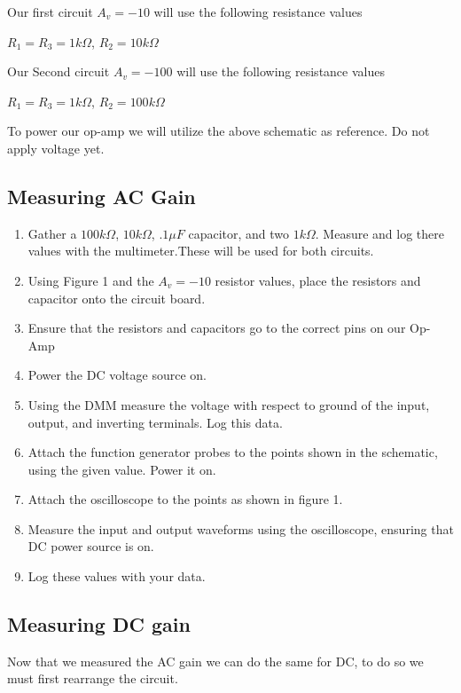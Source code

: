 \documentclass[12pt]{article}
\begin{document}
\begin{center}
	Our first circuit $A_v=-10$ will use the following resistance values
\end{center}
\begin{center}
	$R_1 =R_3= 1k\Omega$, $R_2 = 10k\Omega$
\end{center}
\begin{center}
	Our Second circuit $A_v=-100$ will use the following resistance values
\end{center}

\begin{center}
	$R_1 =R_3= 1k\Omega$, $R_2 = 100k\Omega$
\end{center}


To power our op-amp we will utilize the above schematic as reference. Do not apply voltage yet.



\newpage
\subsection{Measuring AC Gain}
\begin{enumerate}
	\item Gather a $100k\Omega$, $10k\Omega$, $.1\mu F$ capacitor, and two $1k\Omega$. Measure and log there values with the multimeter.These will be used for both circuits.
	\item Using Figure 1 and the $A_v=-10$ resistor values, place the resistors and capacitor onto the circuit board.
	\item Ensure that the resistors and capacitors go to the correct pins on our Op-Amp
	\item Power the DC voltage source on.
	\item Using the DMM measure the voltage with respect to ground of the input, output, and inverting terminals. Log this data.
	\item Attach the function generator probes to the points shown in the schematic, using the given value. Power it on.
	\item Attach the oscilloscope to the points as shown in figure 1.
	\item Measure the input and output waveforms using the oscilloscope, ensuring that DC power source is on.
	\item Log these values with your data.
\end{enumerate}

\subsection{Measuring DC gain}
Now that we measured the AC gain we can do the same for DC, to do so we must first rearrange the circuit.
\end{document}
